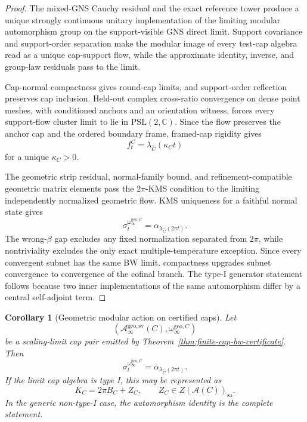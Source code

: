 \documentclass[11pt]{article}
\newtheorem{corollary}[theorem]{Corollary}
\begin{document}
\begin{proof}
The mixed-GNS Cauchy residual and the exact reference tower produce a unique strongly continuous
unitary implementation of the limiting modular automorphism group on the support-visible GNS
direct limit. Support covariance and support-order separation make the modular image of every
test-cap algebra read as a unique cap-support flow, while the approximate identity, inverse, and
group-law residuals pass to the limit.

Cap-normal compactness gives round-cap limits, and support-order reflection preserves cap
inclusion. Held-out complex cross-ratio convergence on dense point meshes, with conditioned
anchors and an orientation witness, forces every support-flow cluster limit to lie in
\(\mathrm{PSL}(2,\mathbb C)\). Since the flow preserves the anchor cap and the ordered boundary
frame, framed-cap rigidity gives
\[
f_t^C=\lambda_{\widehat C}(\kappa_C t)
\]
for a unique \(\kappa_C>0\).

The geometric strip residual, normal-family bound, and refinement-compatible geometric matrix
elements pass the \(2\pi\)-KMS condition to the limiting independently normalized geometric flow.
KMS uniqueness for a faithful normal state gives
\[
\sigma_t^{\omega_\infty^{\mathrm{geo},C}}
=\alpha_{\lambda_{\widehat C}(2\pi t)}.
\]
The wrong-\(\beta\) gap excludes any fixed normalization separated from \(2\pi\), while
nontriviality excludes the only exact multiple-temperature exception. Since every convergent
subnet has the same BW limit, compactness upgrades subnet convergence to convergence of the
cofinal branch. The type-I generator statement follows because two inner implementations of the
same automorphism differ by a central self-adjoint term.
\end{proof}

\begin{corollary}[Geometric modular action on certified caps]\label{cor:certified-cap-modular-action}
Let
\[
(\mathcal A_\infty^{\mathrm{geo,sv}}(C),\omega_\infty^{\mathrm{geo},C})
\]
be a scaling-limit cap pair emitted by Theorem~\ref{thm:finite-cap-bw-certificate}. Then
\[
\sigma_t^{\omega_\infty^{\mathrm{geo},C}}
=
\alpha_{\lambda_{\widehat C}(2\pi t)}.
\]
If the limit cap algebra is type I, this may be represented as
\[
K_C=2\pi B_C+Z_C,\qquad Z_C\in Z(\mathcal A(C))_{\mathrm{sa}}.
\]
In the generic non-type-I case, the automorphism identity is the complete statement.
\end{corollary}
\end{document}
